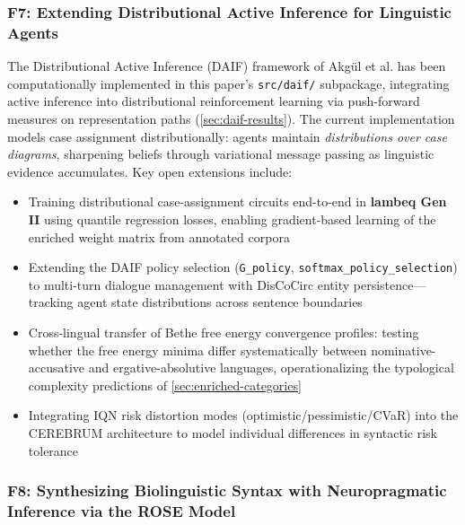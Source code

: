 \documentclass[
]{article}
\providecommand{\tightlist}{%
  \setlength{\itemsep}{0pt}\setlength{\parskip}{0pt}}
\begin{document}
\subsubsection{F7: Extending Distributional Active Inference for
Linguistic
Agents}\label{f7-extending-distributional-active-inference-for-linguistic-agents}

The Distributional Active Inference (DAIF) framework of Akgül et al.
\citeyearpar{akgul2026distributional} has been computationally
implemented in this paper's \texttt{src/daif/} subpackage, integrating
active inference into distributional reinforcement learning
\citep{bellemare2017distributional} via push-forward measures on
representation paths (\autoref{sec:daif-results}). The current
implementation models case assignment distributionally: agents maintain
\emph{distributions over case diagrams}, sharpening beliefs through
variational message passing as linguistic evidence accumulates. Key open
extensions include:

\begin{itemize}
\tightlist
\item
  Training distributional case-assignment circuits end-to-end in
  \textbf{lambeq Gen II} using quantile regression losses, enabling
  gradient-based learning of the enriched weight matrix from annotated
  corpora
\item
  Extending the DAIF policy selection (\texttt{G\_policy},
  \texttt{softmax\_policy\_selection}) to multi-turn dialogue management
  with DisCoCirc entity persistence---tracking agent state distributions
  across sentence boundaries
\item
  Cross-lingual transfer of Bethe free energy convergence profiles:
  testing whether the free energy minima differ systematically between
  nominative-accusative and ergative-absolutive languages,
  operationalizing the typological complexity predictions of
  \autoref{sec:enriched-categories}
\item
  Integrating IQN risk distortion modes (optimistic/pessimistic/CVaR)
  into the CEREBRUM architecture to model individual differences in
  syntactic risk tolerance
\end{itemize}

\subsubsection{F8: Synthesizing Biolinguistic Syntax with Neuropragmatic
Inference via the ROSE
Model}\label{f8-synthesizing-biolinguistic-syntax-with-neuropragmatic-inference-via-the-rose-model}
\end{document}
